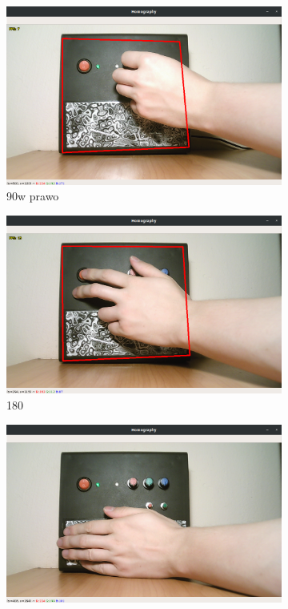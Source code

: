 \documentclass[12pt,twoside,polish]{article}
\begin{document}
\begin{figure}[htb!]
	\begin{subfigure}[b]{0.5\textwidth}
		\includegraphics[width=\textwidth]{test_cover1}
		\caption{90\degree w prawo}
		\label{test_cover1}
	\end{subfigure}
	\begin{subfigure}[b]{0.5\textwidth}
		\includegraphics[width=\textwidth]{test_cover2}
		\caption{180\degree}
		\label{test_cover2}
	\end{subfigure}
	\begin{subfigure}[b]{0.5\textwidth}
		\includegraphics[width=\textwidth]{test_cover3}

\end{subfigure}
\end{figure}
\end{document}
